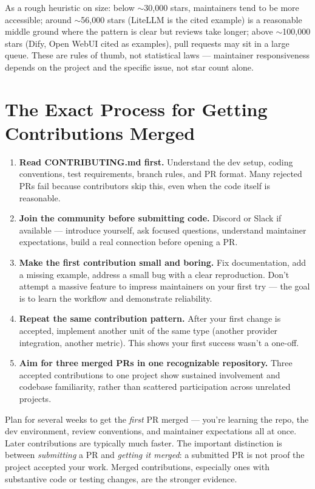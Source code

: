 As a rough heuristic on size: below $\sim$30{,}000 stars, maintainers tend to be more accessible; around
$\sim$56{,}000 stars (LiteLLM is the cited example) is a reasonable middle ground where the pattern is clear but
reviews take longer; above $\sim$100{,}000 stars (Dify, Open WebUI cited as examples), pull requests may sit in a
large queue. These are rules of thumb, not statistical laws --- maintainer responsiveness depends on the project
and the specific issue, not star count alone.

\section{The Exact Process for Getting Contributions Merged}

\begin{enumerate}
  \item \textbf{Read CONTRIBUTING.md first.} Understand the dev setup, coding conventions, test requirements,
  branch rules, and PR format. Many rejected PRs fail because contributors skip this, even when the code itself
  is reasonable.
  \item \textbf{Join the community before submitting code.} Discord or Slack if available --- introduce
  yourself, ask focused questions, understand maintainer expectations, build a real connection before opening a
  PR.
  \item \textbf{Make the first contribution small and boring.} Fix documentation, add a missing example, address
  a small bug with a clear reproduction. Don't attempt a massive feature to impress maintainers on your first
  try --- the goal is to learn the workflow and demonstrate reliability.
  \item \textbf{Repeat the same contribution pattern.} After your first change is accepted, implement another
  unit of the same type (another provider integration, another metric). This shows your first success wasn't a
  one-off.
  \item \textbf{Aim for three merged PRs in one recognizable repository.} Three accepted contributions to one
  project show sustained involvement and codebase familiarity, rather than scattered participation across
  unrelated projects.
\end{enumerate}

\begin{keytakeaway}
Plan for several weeks to get the \emph{first} PR merged --- you're learning the repo, the dev environment,
review conventions, and maintainer expectations all at once. Later contributions are typically much faster. The
important distinction is between \emph{submitting} a PR and \emph{getting it merged}: a submitted PR is not
proof the project accepted your work. Merged contributions, especially ones with substantive code or testing
changes, are the stronger evidence.
\end{keytakeaway}

